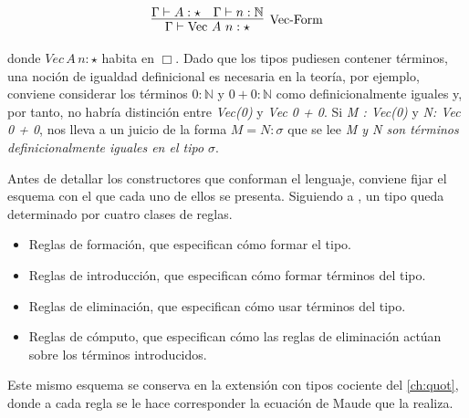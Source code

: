 \begin{gather}
  \infer[\text{Vec-Form}]
  {\Gamma \vdash \mathrm{Vec}\ A\ n : \star}
  {\Gamma \vdash A : \star & \Gamma \vdash n : \mathbb{N}}
\end{gather}

donde $\textit{Vec}\,A\, n : \star$ habita en $\Box$.
\newline
\newline
\indent Dado que los tipos pudiesen contener términos, una noción de igualdad definicional es necesaria en la teoría, por ejemplo, conviene considerar los términos $0 : \mathbb{N}$ y $0 + 0 : \mathbb{N}$ como definicionalmente iguales y, por tanto, no habría distinción entre \textit{Vec(0)} y \textit{Vec 0 + 0}. Si \textit{M : Vec(0)} y \textit{N: Vec 0 + 0}, nos lleva a un juicio de la forma $M = N : \sigma$ que se lee \textit{M y N son términos definicionalmente iguales en el tipo $\sigma$}.

\indent Antes de detallar los constructores que conforman el lenguaje, conviene fijar el esquema con el que cada uno de ellos se presenta. Siguiendo a \citet{hoffman2009}, un tipo queda determinado por cuatro clases de reglas.
\begin{itemize}
  \item Reglas de formación, que especifican cómo formar el tipo.
  \item Reglas de introducción, que especifican cómo formar términos del tipo.
  \item Reglas de eliminación, que especifican cómo usar términos del tipo.
  \item Reglas de cómputo, que especifican cómo las reglas de eliminación actúan sobre los términos introducidos.
\end{itemize}

Este mismo esquema se conserva en la extensión con tipos cociente del \cref{ch:quot}, donde a cada regla se le hace corresponder la ecuación de Maude que la realiza.

